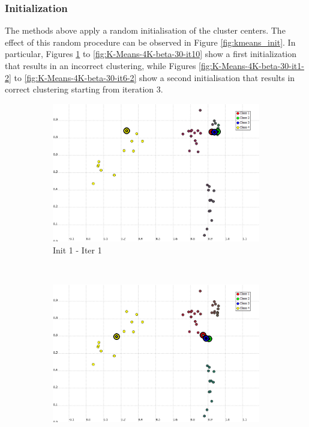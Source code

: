 \documentclass[a4paper,10pt]{article}
\begin{document}
\subsubsection*{Initialization}

The methods above apply a random initialisation of the cluster centers. The effect of this random procedure can be observed in Figure \ref{fig:kmeans_init}. In particular, Figures \ref{fig:K-Means-4K-beta-30-it1} to \ref{fig:K-Means-4K-beta-30-it10} show a first initialization that results in an incorrect clustering, while Figures \ref{fig:K-Means-4K-beta-30-it1-2} to \ref{fig:K-Means-4K-beta-30-it6-2} show a second initialisation that results in correct clustering starting from iteration 3.

\begin{figure}[H]
\centering
    \begin{subfigure}[t]{0.2\textwidth}
      \centering
      \includegraphics[width=\textwidth]{pictures/K-Means-4K-beta-30-it1.png}
      \caption{Init 1 - Iter 1}
      \label{fig:K-Means-4K-beta-30-it1}
     \end{subfigure}
      ~
    \begin{subfigure}[t]{0.2\textwidth}
      \centering
      \includegraphics[width=\textwidth]{pictures/K-Means-4K-beta-30-it2.png}

\end{subfigure}
\end{figure}
\end{document}
